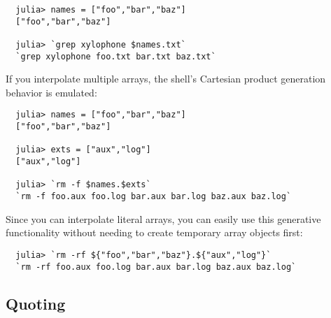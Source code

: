 \documentclass{article}
\begin{document}
\begin{verbatim}
  julia> names = ["foo","bar","baz"]
  ["foo","bar","baz"]

  julia> `grep xylophone $names.txt`
  `grep xylophone foo.txt bar.txt baz.txt`
\end{verbatim}
If you interpolate multiple arrays, the shell's Cartesian product generation behavior is emulated:
\begin{verbatim}
  julia> names = ["foo","bar","baz"]
  ["foo","bar","baz"]

  julia> exts = ["aux","log"]
  ["aux","log"]

  julia> `rm -f $names.$exts`
  `rm -f foo.aux foo.log bar.aux bar.log baz.aux baz.log`
\end{verbatim}
Since you can interpolate literal arrays, you can easily use this generative functionality without needing to create temporary array objects first:
\begin{verbatim}
  julia> `rm -rf ${"foo","bar","baz"}.${"aux","log"}`
  `rm -rf foo.aux foo.log bar.aux bar.log baz.aux baz.log`
\end{verbatim}

\subsection{Quoting}
\end{document}
